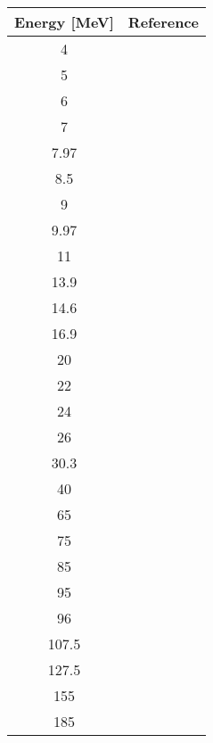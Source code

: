 \begin{tabular}{c c} 
    \toprule 
    \bf{Energy [MeV]} & \bf{Reference} \\
    \midrule
    4 & \cite{Annand85}\\
    5 & \cite{Annand85}\\
    6 & \cite{Annand85}\\
    7 & \cite{Annand85}\\
    7.97 & \cite{Roberts91}\\
    8.5 & \cite{Kinney74a}\\
    9 & \cite{Rapaport78}\\
    9.97 & \cite{Delaroche83}\\
    11 & \cite{Rapaport78}\\
    13.9 & \cite{Floyd82, FloydPhDThesis}\\
    14.6 & \cite{Hansen85}\\
    16.9 & \cite{FloydPhDThesis}\\
    20 & \cite{Finlay84}\\
    22 & \cite{Finlay84}\\
    24 & \cite{Finlay84}\\
    26 & \cite{Rapaport78}\\
    30.3 & \cite{DevitoPhDThesis}\\
    40 & \cite{DevitoPhDThesis}\\
    65 & \cite{Osborne04}\\
    75 & \cite{Osborne04}\\
    85 & \cite{Osborne04}\\
    95 & \cite{Osborne04}\\
    96 & \cite{Osborne04}\\
    107.5 & \cite{Osborne04}\\
    127.5 & \cite{Osborne04}\\
    155 & \cite{Osborne04}\\
    185 & \cite{Osborne04}\\
    \bottomrule
\end{tabular}
